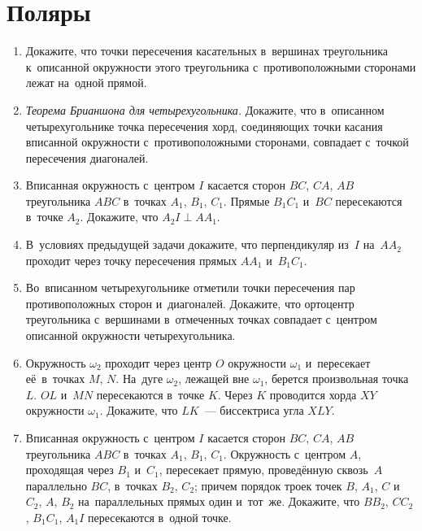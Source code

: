 

\section*{Поляры}


\begin{enumerate}

\item
Докажите, что точки пересечения касательных в~вершинах треугольника к~описанной
окружности этого треугольника с~противоположными сторонами лежат на~одной
прямой.

\item\emph{Теорема Брианшона для четырехугольника.}
Докажите, что в~описанном четырехугольнике точка пересечения хорд, соединяющих
точки касания вписанной окружности с~противоположными сторонами, совпадает
с~точкой пересечения диагоналей.

\item
Вписанная окружность с~центром $I$ касается сторон $BC$, $CA$, $AB$
треугольника $ABC$ в~точках $A_1$, $B_1$, $C_1$.
Прямые $B_1 C_1$ и~$BC$ пересекаются в~точке $A_2$.
Докажите, что $A_2 I \perp A A_1$.

\item
В~условиях предыдущей задачи докажите, что перпендикуляр из~$I$ на~$A A_2$
проходит через точку пересечения прямых $A A_1$ и~$B_1 C_1$.

\item
Во~вписанном четырехугольнике отметили точки пересечения пар противоположных
сторон и~диагоналей.
Докажите, что ортоцентр треугольника с~вершинами в~отмеченных точках совпадает
с~центром описанной окружности четырехугольника.

\item
Окружность $\omega_2$ проходит через центр $O$ окружности $\omega_1$
и~пересекает её~в~точках $M$, $N$.
На~дуге $\omega_2$, лежащей вне $\omega_1$, берется произвольная точка $L$.
$OL$ и~$MN$ пересекаются в~точке $K$.
Через $K$ проводится хорда $XY$ окружности $\omega_1$.
Докажите, что $LK$~--- биссектриса угла $XLY$.

\item
Вписанная окружность с~центром $I$ касается сторон $BC$, $CA$, $AB$
треугольника $ABC$ в~точках $A_1$, $B_1$, $C_1$.
Окружность с~центром $A$, проходящая через $B_1$ и~$C_1$, пересекает прямую,
проведённую сквозь~$A$ параллельно $BC$, в~точках $B_2$, $C_2$;
причем порядок троек точек $B$, $A_1$, $C$ и~$C_2$, $A$, $B_2$ на~параллельных
прямых один и~тот~же.
Докажите, что $B B_2$, $C C_2$, $B_1 C_1$, $A_1 I$ пересекаются в~одной точке.


\end{enumerate}
